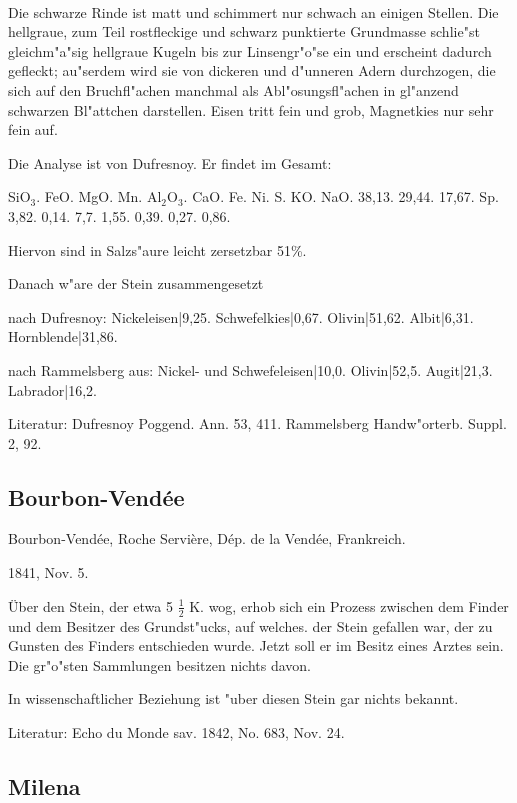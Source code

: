 \documentclass[a4paper, 11pt, oneside]{article}
\begin{document}
\paragraph{}
Die schwarze Rinde ist matt und schimmert nur schwach an einigen Stellen. Die hellgraue, zum Teil rostfleckige und schwarz punktierte Grundmasse schlie"st gleichm"a"sig hellgraue Kugeln bis zur Linsengr"o"se ein und erscheint dadurch gefleckt; au"serdem wird sie von dickeren und d"unneren Adern durchzogen, die sich auf den Bruchfl"achen manchmal als Abl"osungsfl"achen in gl"anzend schwarzen Bl"attchen darstellen. Eisen tritt fein und grob, Magnetkies nur sehr fein auf.

Die Analyse ist von Dufresnoy. Er findet im Gesamt:

SiO$_{3}$. FeO. MgO. Mn. Al$_{2}$O$_{3}$. CaO. Fe. Ni. S. KO. NaO.  
38,13. 29,44. 17,67. Sp. 3,82. 0,14. 7,7. 1,55. 0,39. 0,27. 0,86.

Hiervon sind in Salzs"aure leicht zersetzbar 51\%.

Danach w"are der Stein zusammengesetzt

nach Dufresnoy:  
Nickeleisen|9,25.  
Schwefelkies|0,67.  
Olivin|51,62.  
Albit|6,31.  
Hornblende|31,86.

nach Rammelsberg aus:  
Nickel- und Schwefeleisen|10,0.  
Olivin|52,5.  
Augit|21,3.  
Labrador|16,2.

Literatur: Dufresnoy Poggend. Ann. 53, 411. Rammelsberg Handw"orterb. Suppl. 2, 92.

\subsection{Bourbon-Vendée}

Bourbon-Vendée, Roche Servière, Dép. de la Vendée, Frankreich.

1841, Nov. 5.

Über den Stein, der etwa 5 $\frac{1}{2}$ K. wog, erhob sich ein Prozess zwischen dem Finder und dem Besitzer des Grundst"ucks, auf welches. der Stein gefallen war, der zu Gunsten des Finders entschieden wurde. Jetzt soll er im Besitz eines Arztes sein. Die gr"o"sten Sammlungen besitzen nichts davon.

In wissenschaftlicher Beziehung ist "uber diesen Stein gar nichts bekannt.

Literatur: Echo du Monde sav. 1842, No. 683, Nov. 24.

\subsection{Milena}
\end{document}
